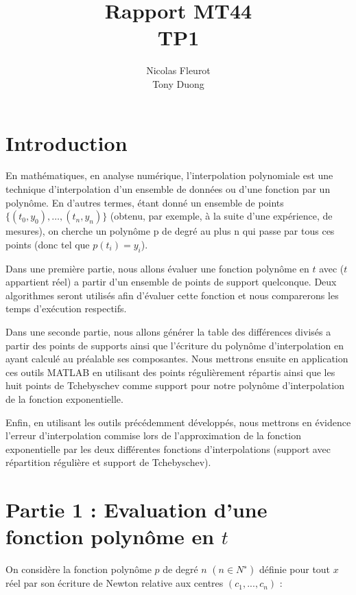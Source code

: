\documentclass[a4paper,10pt]{report}
\title{Rapport MT44\\\huge{TP1}}
\author{Nicolas Fleurot\\Tony Duong}
\begin{document}
\maketitle

\tableofcontents

\chapter*{Introduction}

    En mathématiques, en analyse numérique, l'interpolation polynomiale est une technique d'interpolation d'un ensemble de données ou d'une fonction par un polynôme. En d'autres termes, étant donné un ensemble de points $\lbrace{(t_{0}, y_{0}), … , (t_{n},y_{n})}\rbrace $ (obtenu, par exemple, à la suite d'une expérience, de mesures), on cherche un polynôme p de degré au plus n qui passe par tous ces points (donc tel que $p(t_{i}) = y_{i}$). 

    Dans une première partie, nous allons évaluer une fonction polynôme en $t$ avec ($t$ appartient réel) a partir d’un ensemble de points de support quelconque. Deux algorithmes seront utilisés afin d’évaluer cette fonction et nous comparerons les temps d’exécution respectifs. 

Dans une seconde partie, nous allons générer la table des différences divisés a partir des points de supports ainsi que l’écriture du polynôme d’interpolation en ayant calculé au préalable ses composantes. Nous mettrons ensuite en application ces outils MATLAB en utilisant des points régulièrement répartis ainsi que les huit points de Tchebyschev comme support pour notre polynôme d’interpolation de la fonction exponentielle.

Enfin, en utilisant les outils précédemment développés, nous mettrons en évidence l’erreur d’interpolation commise lors de l’approximation de la fonction exponentielle par les deux différentes fonctions d’interpolations (support avec répartition régulière et support de Tchebyschev).

\chapter*{Partie 1 : Evaluation d’une fonction polynôme en $t$}

On considère la fonction polynôme $p$ de degré $n$ $(n \in N^{∗} )$ définie pour tout $x$
réel par son écriture de Newton relative aux centres $(c_{1} , ..., c_{n})$ :
\end{document}
